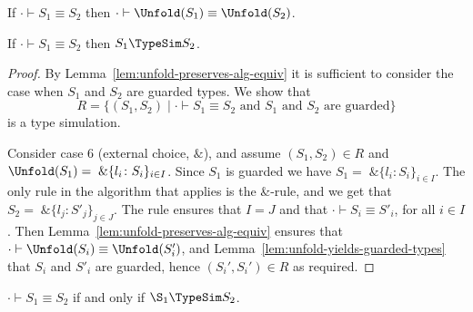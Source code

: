 \begin{lemma}
  \label{lem:unfold-preserves-alg-equiv}
  If $\cdot\vdash S_1 \equiv S_2$ then
  $\cdot\vdash \Unfold(S_1) \equiv \Unfold(S_2)$.
\end{lemma}

\begin{theorem}
  If $\cdot\vdash S_1 \equiv S_2$ then $S_1 \TypeSim S_2$.
\end{theorem}
%
\begin{proof}
  By Lemma~\ref{lem:unfold-preserves-alg-equiv} it is sufficient to
  consider the case when $S_1$ and $S_2$ are guarded types. We show
  that
  \begin{equation*}
    R = \{(S_1,S_2) \mid \cdot\vdash S_1 \equiv S_2 \text{ and } S_1
    \text{ and } S_2 \text{ are guarded}\}
  \end{equation*}
  is a type simulation.

  Consider case 6 (external choice, $\&$), and assume
  $(S_1,S_2) \in R$ and
  $\Unfold(S_1) = \;\&\{l_i\colon S_i\}_{i\in I}$. Since $S_1$ is
  guarded we have $S_1=\;\&\{l_i\colon S_i\}_{i\in I}$. The only rule
  in the algorithm that applies is the \&-rule, and we get that
  $S_2 = \;\&\{l_j\colon S'_j\}_{j\in J}$. The rule ensures that $I=J$
  and that $\cdot\vdash S_i \equiv S'_i$, for all $i \in I$. Then
  Lemma~\ref{lem:unfold-preserves-alg-equiv} ensures that
  $\cdot\vdash \Unfold(S_i) \equiv \Unfold(S'_i)$, and
  Lemma~\ref{lem:unfold-yields-guarded-types} that $S_i$ and $S'_i$
  are guarded, hence $(S_i',S_i') \in R$ as required.  
\end{proof}

\begin{corollary}
  $\cdot \vdash S_1 \equiv S_2$ if and only if $\S_1 \TypeSim S_2$.
\end{corollary}

